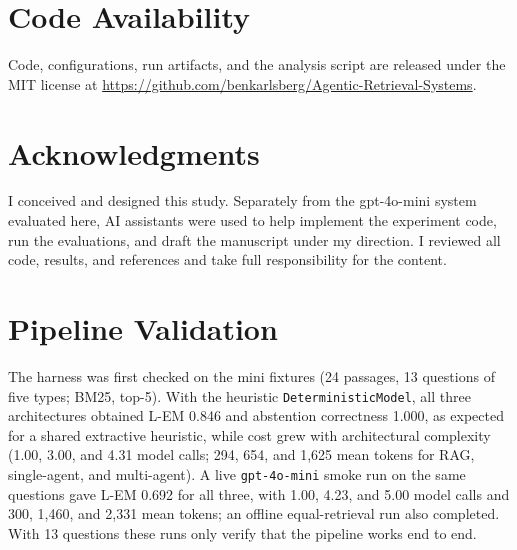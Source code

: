 \documentclass[11pt,a4paper]{article}
\newcommand{\lem}{L-EM}
\begin{document}
\section*{Code Availability}
Code, configurations, run artifacts, and the analysis script are released
under the MIT license at
\url{https://github.com/benkarlsberg/Agentic-Retrieval-Systems}.

\section*{Acknowledgments}
I conceived and designed this study. Separately from the gpt-4o-mini system
evaluated here, AI assistants were used to help implement the experiment code,
run the evaluations, and draft the manuscript under my direction. I reviewed
all code, results, and references and take full responsibility for the
content.

\appendix
\section{Pipeline Validation}
\label{app:validation}

The harness was first checked on the mini fixtures (24 passages, 13 questions
of five types; BM25, top-5).
With the heuristic \texttt{DeterministicModel}, all three architectures
obtained \lem{} 0.846 and abstention correctness 1.000, as expected for a
shared extractive heuristic, while cost grew with architectural complexity
(1.00, 3.00, and 4.31 model calls; 294, 654, and 1{,}625 mean tokens for RAG,
single-agent, and multi-agent).
A live \texttt{gpt-4o-mini} smoke run on the same questions gave \lem{} 0.692
for all three, with 1.00, 4.23, and 5.00 model calls and 300, 1{,}460, and
2{,}331 mean tokens; an offline equal-retrieval run also completed.
With 13 questions these runs only verify that the pipeline works end to
end.

\renewcommand{\bibfont}{\small}
\setlength{\bibsep}{3pt plus 1pt}


\end{document}
